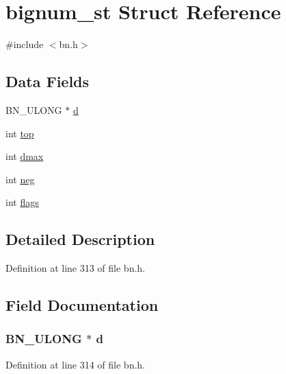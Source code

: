 \hypertarget{structbignum__st}{}\section{bignum\+\_\+st Struct Reference}
\label{structbignum__st}


{\ttfamily \#include $<$bn.\+h$>$}

\subsection*{Data Fields}
\begin{DoxyCompactItemize}
\item 
B\+N\+\_\+\+U\+L\+O\+NG $\ast$ \hyperlink{structbignum__st_ab49a193400f621086a6c3f82389b7a23}{d}
\item 
int \hyperlink{structbignum__st_af93f4f37fc2ad9c37af4a715423b110c}{top}
\item 
int \hyperlink{structbignum__st_a3957bf07e2d7a09bae62601592079d3d}{dmax}
\item 
int \hyperlink{structbignum__st_a186b6342d483ea691785eb9a6d88605b}{neg}
\item 
int \hyperlink{structbignum__st_ac8bf36fe0577cba66bccda3a6f7e80a4}{flags}
\end{DoxyCompactItemize}


\subsection{Detailed Description}


Definition at line 313 of file bn.\+h.



\subsection{Field Documentation}
\subsubsection[{\texorpdfstring{d}{d}}]{\setlength{\rightskip}{0pt plus 5cm}B\+N\+\_\+\+U\+L\+O\+NG $\ast$ d}\hypertarget{structbignum__st_ab49a193400f621086a6c3f82389b7a23}{}\label{structbignum__st_ab49a193400f621086a6c3f82389b7a23}


Definition at line 314 of file bn.\+h.

